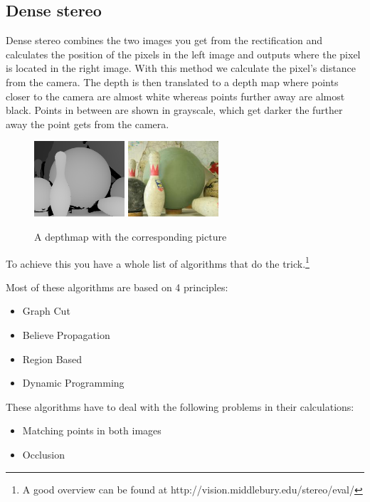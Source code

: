 \documentclass[a4paper]{article}
\begin{document}
\subsection{Dense stereo}
Dense stereo combines the two images you get from the rectification
and calculates the position of the pixels in the left image and
outputs where the pixel is located in the right image. With this method we
calculate the pixel's distance from the camera. 
The depth is then translated to a depth map where points closer
to the camera are almost white whereas points further away are almost
black. Points in between are shown in grayscale, which get darker
 the further away the point gets from the camera.

\begin{figure}
\centering
\includegraphics[width=0.3\textwidth]{depthmap}
\includegraphics[width=0.3\textwidth]{depthmap_original}
\caption{A depthmap with the corresponding picture}
\end{figure}

To achieve this you have a whole list of algorithms that do
the trick.\footnote{A good overview can be found at
http://vision.middlebury.edu/stereo/eval/}

Most of these algorithms are based on 4 principles: 

\begin{itemize}
\item Graph Cut
\item Believe Propagation
\item Region Based
\item Dynamic Programming
\end{itemize}

These algorithms have to deal with the following problems in their
calculations:

\begin{itemize}
    \item Matching points in both images
    \item Occlusion
\end{itemize}
\end{document}
